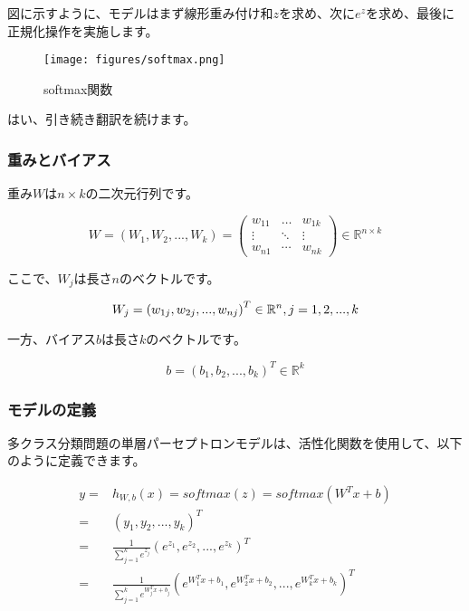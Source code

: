 \begin{content}
図に示すように、モデルはまず線形重み付け和$z$を求め、次に$e^z$を求め、最後に正規化操作を実施します。

\begin{figure}[H]
\centering
\texttt{[image: figures/softmax.png]}
\caption{softmax関数}
 \label{fig:softmax}
\end{figure}

はい、引き続き翻訳を続けます。

\subsubsection{重みとバイアス}

重み$W$は$n \times k$の二次元行列です。

\[
W = \left( {{W_1},{W_2},...,{W_k}} \right) = \left( {\begin{array}{*{20}{c}}
  {{w_{11}}}& \ldots &{{w_{1k}}} \\ 
   \vdots & \ddots & \vdots  \\ 
  {{w_{n1}}}& \cdots &{{w_{nk}}} 
\end{array}} \right) \in {\mathbb{R}^{n \times k}}
\]

ここで、$W_j$は長さ$n$のベクトルです。

\[
{W_j} = {\left( {{w_{1j}},{w_{2j}},...,{w_{nj}}} \right)^T} \in {\mathbb{R}^n}, j = 1,2,...,k \\
\]

一方、バイアス$b$は長さ$k$のベクトルです。

\[
b = {({b_1},{b_2},...,{b_k})^T} \in {\mathbb{R}^k}
\]

\subsubsection{モデルの定義}

多クラス分類問題の単層パーセプトロンモデルは、活性化関数を使用して、以下のように定義できます。

\[\begin{aligned}
  y =  & {h_{W,b}}(x) = softmax (z) = softmax ({W^T}x + b) \\ 
   =  & {\left( {{y_1},{y_2},...,{y_k}} \right)^T} \\ 
   =  & \frac{1}{{\sum\limits_{j = 1}^k {{e^{{z_j}}}} }}{\left( {{e^{{z_1}}},{e^{{z_2}}},...,{e^{{z_k}}}} \right)^T} \\ 
   =  & \frac{1}{{\sum\limits_{j = 1}^k {{e^{W_j^Tx + {b_j}}}} }}{\left( {{e^{W_1^Tx + {b_1}}},{e^{W_2^Tx + {b_2}}},...,{e^{W_k^Tx + {b_k}}}} \right)^T} \ 
\end{aligned} \]


\end{content}
